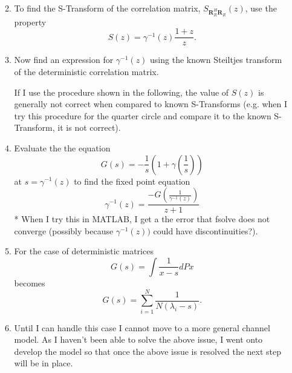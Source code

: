\documentclass[12pt,a4paper]{report}
\begin{document}
\begin{enumerate}
\begin{enumerate}
\begin{equation}
		\end{equation}
	\item 
		To find the S-Transform of the correlation matrix, $S_ {\mathbf{R}_{R}^H\mathbf{R}_{R}}(z)$,
		use the property 
		\begin{equation}
		 S(z) = \gamma^{-1}(z)\frac{1+z}{z}.
		\end{equation}
	\item
		Now find an expression for $\gamma^{-1}(z)$ using the known Steiltjes transform of the deterministic
		 correlation matrix. 
		 \par
		 If I use the procedure shown in the following, the value of $S(z)$ is 
		generally not correct when compared to known S-Transforms (e.g. when I try this procedure for the 
		quarter circle and compare it to the known S-Transform, it is not correct).
	\item
		Evaluate the the equation 
		\begin{equation}
		G(s)=  -\frac{1}{s} (1+\gamma\left(\frac{1}{s}\right))
		\end{equation}
		at $s = \gamma^{-1}(z)$ 
		to find the fixed point equation
		 \begin{equation}
		\gamma^{-1}(z) = \frac{-G(\frac{1}{\gamma^{-1}(z)})}{z+1}
		\end{equation}
		* When I try this in MATLAB, I get a the error that fsolve does not converge
		(possibly because $\gamma^{-1}(z))$ could have discontinuities?).
	\item 
		For the case of deterministic matrices 
		\begin{equation}
		G(s) = \int \frac{1}{x-s} dPx
		\end{equation}
		becomes 
		\begin{equation}
		G(s) = \sum_{i=1}^{N} \frac{1}{N (\lambda_i - s)}.
		\end{equation}	
	\item
		Until I can handle this case I cannot move to a more general channel model. As I haven't been able to solve
		 the above issue, I went onto develop the model so that once the above issue is resolved the next step
		 will be in place. 
	\end{enumerate}


\end{enumerate}
\end{document}
